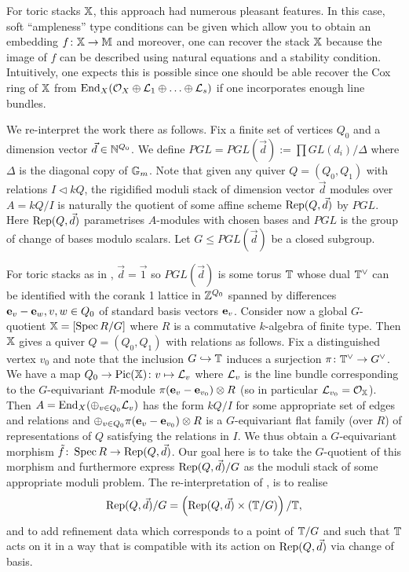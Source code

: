 \documentclass[12pt]{amsart}
\begin{document}
For toric stacks $\mathbb{X}$, this approach had numerous pleasant features. In this case, soft ``ampleness'' type conditions can be given which allow you to obtain an embedding $f \colon \mathbb{X} \to \mathbb{M}$ and moreover, one can recover the stack $\mathbb{X}$ because the image of $f$ can be described using natural equations and a stability condition. Intuitively, one expects this is possible since one should be able recover the Cox ring of $\mathbb{X}$ from $\operatorname{End}_X (\mathcal{O}_X \oplus \mathcal{L}_1 \oplus \ldots \oplus \mathcal{L}_s)$ if one incorporates enough line bundles. 

We re-interpret the work there as follows. Fix a finite set of vertices $Q_0$ and a dimension vector $\vec{d} \in\mathbb{N}^{Q_0}$. We define $PGL = PGL(\vec{d}):= \prod GL(d_i)/\Delta$  where $\Delta$ is the diagonal copy of $\mathbb{G}_m$. Note that given any quiver $Q= (Q_0,Q_1)$ with relations $I \triangleleft kQ$, the rigidified moduli stack of dimension vector $\vec{d}$ modules over $A = kQ/I$ is naturally the quotient of some affine scheme $\operatorname{Rep}(Q,\vec{d})$ by $PGL$. Here $\operatorname{Rep}(Q,\vec{d})$ parametrises $A$-modules with chosen bases and $PGL$ is the group of change of bases modulo scalars. Let $G \leq PGL(\vec{d})$ be a closed subgroup. 

For toric stacks as in \cite{Abd}, $\vec{d} = \vec{1}$ so $PGL(\vec{d})$ is some torus $\mathbb{T}$ whose dual $\mathbb{T}^{\vee}$ can be identified with the corank 1 lattice in $\mathbb{Z}^{Q_0}$ spanned by differences $\mathbf{e}_v - \mathbf{e}_w, v,w \in Q_0$ of standard basis vectors $\mathbf{e}_v$. Consider now a global $G$-quotient $\mathbb{X} = [\operatorname{Spec} R/ G]$  where  $R$ is a commutative $k$-algebra of finite type. Then $\mathbb{X}$ gives a quiver $Q = (Q_0,Q_1)$ with relations as follows. Fix a distinguished vertex $v_0$ and note that the inclusion $G \hookrightarrow \mathbb{T}$ induces a surjection $\pi \colon \mathbb{T}^{\vee} \to G^{\vee}$. We have a map $Q_0 \to \operatorname{Pic} (\mathbb{X}) \colon v \mapsto \mathcal{L}_v$ where $\mathcal{L}_v$ is the line bundle corresponding to the $G$-equivariant $R$-module $\pi(\mathbf{e}_v - \mathbf{e}_{v_0}) \otimes R$ (so in particular $\mathcal{L}_{v_0} = \mathcal{O}_{\mathbb{X}}$). Then $A = \operatorname{End}_X (\oplus_{v \in Q_0} \mathcal{L}_v)$ has the form $kQ/I$ for some appropriate set of edges and relations and $\oplus_{v \in Q_0} \pi(\mathbf{e}_v - \mathbf{e}_{v_0}) \otimes R$ is a $G$-equivariant flat family (over $R$) of representations of $Q$ satisfying the relations in $I$. We thus obtain a $G$-equivariant morphism $\tilde{f} \colon \operatorname{Spec} R \to \operatorname{Rep}(Q,\vec{d})$. Our goal here is to take the $G$-quotient of this morphism and furthermore express $\operatorname{Rep}(Q,\vec{d})/G$ as the moduli stack of some appropriate moduli problem. The re-interpretation of \cite{Abd}, is to realise 
$$ \operatorname{Rep}(Q,\vec{d})/G = \left(\operatorname{Rep}(Q,\vec{d}) \times (\mathbb{T}/G) \right)/\mathbb{T},$$
and to add refinement data which corresponds to a point of $\mathbb{T}/G$ and such that $\mathbb{T}$ acts on it in a way that is compatible with its action on $\operatorname{Rep}(Q,\vec{d})$ via change of basis. 
\end{document}
